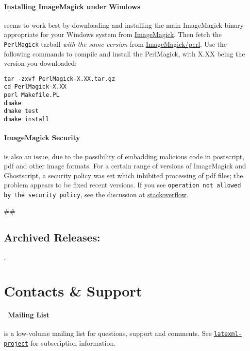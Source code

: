 \documentclass{article}
\begin{document}
\paragraph*{Installing ImageMagick under Windows}\label{get.windows.imagemagick}
seems to work best by downloading and installing the main ImageMagick binary
appropriate for your Windows system
from \href{https://imagemagick.org/script/binary-releases.php#windows}{ImageMagick}.
Then fetch the \texttt{PerlMagick} tarball \emph{with the same version} from
\href{https://imagemagick.com/download/perl/}{ImageMagick/perl}.
Use the following commands to compile and install the PerlMagick,
with X.XX being the version you downloaded:
\begin{lstlisting}[style=shell]
tar -zxvf PerlMagick-X.XX.tar.gz
cd PerlMagick-X.XX
perl Makefile.PL
dmake
dmake test
dmake install
\end{lstlisting}

\paragraph*{ImageMagick Security} is also an issue, due to the possibility of embadding
malicious code in postscript, pdf and other image formats.
For a certain range of versions of ImageMagick and Ghostscript, a security policy was set
which inhibited processing of pdf files; the problem appears to be fixed recent versions.
If you see \texttt{operation not allowed by the security policy}, see the discussion
at \href{https://stackoverflow.com/a/53180170}{stackoverflow}.

\expandafter\ifx\expandafter#\AllReleases#\else
\subsection{Archived Releases:}\label{get.archive}
\AllReleases.
\fi
\section{Contacts \& Support}\label{contact}

\paragraph{\LaTeXML\ Mailing List}\label{contact.list}
is a low-volume mailing list for questions, support and comments.
See \href{https://lists.informatik.uni-erlangen.de/mailman/listinfo/latexml}{\texttt{latexml-project}} for subscription information.
\end{document}
